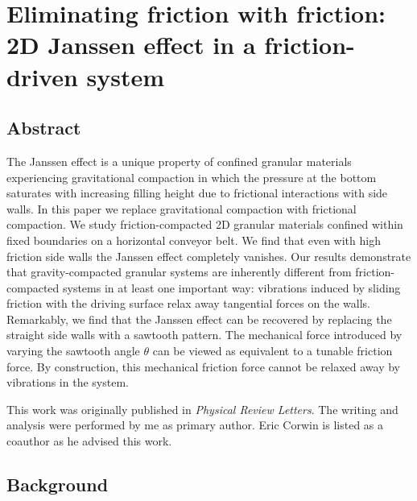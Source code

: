 \chapter{Eliminating friction with friction: 2D Janssen effect in a friction-driven system}
\author{Mohammad Yasinul Karim, Eric I. Corwin}

%

\section{Abstract}

The Janssen effect is a unique property of confined granular materials experiencing gravitational compaction in which the pressure at the bottom saturates with increasing filling height due to frictional interactions with side walls. In this paper we replace gravitational compaction with frictional compaction.  We study friction-compacted 2D granular materials confined within fixed boundaries on a horizontal conveyor belt. We find that even with high friction side walls the Janssen effect completely vanishes. Our results demonstrate that gravity-compacted granular systems are inherently different from friction-compacted systems in at least one important way: vibrations induced by sliding friction with the driving surface relax away tangential forces on the walls. Remarkably, we find that the Janssen effect can be recovered by replacing the straight side walls with a sawtooth pattern. The mechanical force introduced by varying the sawtooth angle $\theta$ can be viewed as equivalent to a tunable friction force. By construction, this mechanical friction force cannot be relaxed away by vibrations in the system.

This work was originally published in \textit{Physical Review Letters}.  The writing and analysis were performed by me as primary author.  Eric Corwin is listed as a coauthor as he advised this work.  

\section{Background}


